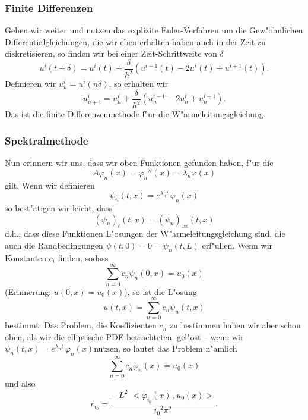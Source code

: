 \subsubsection{Finite Differenzen}
Gehen wir weiter und nutzen das explizite Euler-Verfahren um die 
Gew"ohnlichen Differentialgleichungen, die wir eben erhalten haben
auch in der Zeit zu diskretisieren, so finden wir bei einer Zeit-Schrittweite von $\delta$
$$ u^i(t+\delta) = u^i(t)+ \frac{\delta}{h^2}(u^{i-1}(t) - 2 u^i(t) + u^{i+1}(t)).$$
Definieren wir $u^i_n = u^i(n\delta)$, so erhalten wir 
$$ u^i_{n+1} = u^i_n + 
\frac{\delta}{h^2}(u^{i-1}_n - 2 u^i_n + u^{i+1}_n)
.$$
Das ist die finite Differenzenmethode f"ur die W"armeleitungsgleichung.


\subsubsection{Spektralmethode}

Nun erinnern wir uns, dass wir oben Funktionen gefunden haben, f"ur 
die 
$$ A\varphi_n(x) = \varphi_n''(x) =\lambda_n \varphi(x)$$
gilt. Wenn wir definieren
$$\psi_n(t,x) = e^{\lambda_n t}\,\varphi_n(x) $$
so best"atigen wir leicht, dass 
$$ (\psi_n)_t(t,x) = (\psi_n)_{xx}(t,x)$$
d.h., dass diese Funktionen L"osungen der W"armeleitungsgleichung sind, die auch
die Randbedingungen $\psi(t,0)=0=\psi_n(t,L)$ erf"ullen. 
Wenn wir Konstanten $c_i$ finden, sodass
$$  \sum_{n=0}^\infty c_n \psi_n(0,x) = u_0(x)$$
(Erinnerung: $u(0,x)=u_0(x)$), so ist die L"osung
$$ u(t,x) = \sum_{n=0}^\infty c_n \psi_n(t,x)$$
bestimmt. Das Problem, die Koeffizienten $c_n$ zu bestimmen
haben wir aber schon oben, als wir die elliptische PDE
betrachteten, gel"ost -- wenn wir $\psi_n(t,x) = e^{\lambda_n t}\,\varphi_n(x) $nutzen, so lautet das Problem n"amlich
$$  \sum_{n=0}^\infty c_n \varphi_n(x) = u_0(x)$$
und also 
$$ c_{i_0} =  \frac{-\,L^2\,\, <\varphi_{i_0}(x)\,,u_0(x)>}{{i_0}^2\pi^2}
.$$


